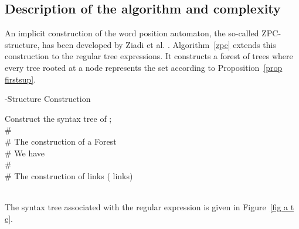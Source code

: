 \documentclass{llncs}
\begin{document}
\subsection{Description of the algorithm and complexity}

An implicit construction of the word position automaton, the so-called ZPC-structure, has been developed by Ziadi et al. \cite{ZPC96,ZPC}.
Algorithm~\ref{zpc} extends this construction to the regular tree expressions. It constructs
a forest of trees where every tree rooted at a node  represents the set  according to Proposition~\ref{prop firstsup}. 

\begin{algorithm}[H]
\caption{-Structure Construction}
\label{zpc}
 Construct the syntax tree   of ;\\
{\#}\\
{\# The construction of a  Forest}\\
{\# We have }\\
{\# }\\
{\# The construction of  links ( links)}\\
  {\ }\\
\end{algorithm}
\begin{example}
The syntax tree   associated with the regular expression   is given in Figure~\ref{fig a t e}. 
	\end{example}
\end{document}

